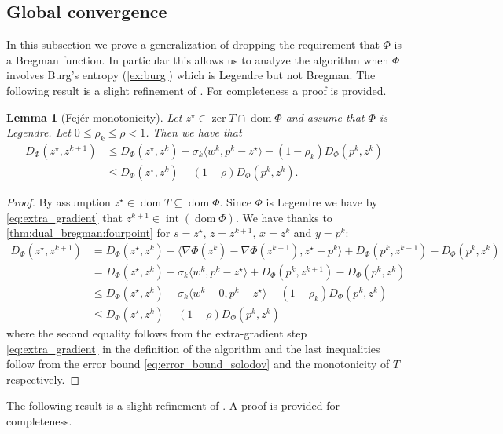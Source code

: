 \documentclass[11pt,onecolumn]{article}
\DeclareMathOperator{\dom}{dom}
\DeclareMathOperator{\intr}{int}
\DeclareMathOperator{\zer}{zer}
\newtheorem{lemma}[lemma]{Lemma}
\theoremstyle{remark}
\begin{document}
\subsection{Global convergence} \label{sec:global_ppa}
In this subsection we prove a generalization of \cite[Theorem 3.2(1)]{solodov2000inexact} dropping the requirement that $\Phi$ is a Bregman function.
In particular this allows us to analyze the algorithm when $\Phi$ involves Burg's entropy (\cref{ex:burg}) which is Legendre but not Bregman.
The following result is a slight refinement of \cite[Lemma 4.1]{solodov2000inexact}. For completeness a proof is provided.
\begin{lemma}[Fej\'er monotonicity] \label{thm:fejer_prox_solodov}
Let $z^\star \in \zer T \cap \dom \Phi$ and assume that $\Phi$ is Legendre. Let $0\leq \rho_k\leq \rho < 1$. Then we have that
\begin{align*}
D_\Phi(z^\star,z^{k+1}) &\leq D_\Phi(z^\star,z^k) - \sigma_k \langle w^{k}, p^{k}-z^\star \rangle -(1-\rho_k)D_\Phi(p^{k},z^k) \\
&\leq D_\Phi(z^\star,z^k) -(1-\rho)D_\Phi(p^{k},z^k).
\end{align*}
\end{lemma}
\begin{proof}
By assumption $z^\star \in \dom T \subseteq \dom \Phi$. Since $\Phi$ is Legendre we have by \eqref{eq:extra_gradient} that $z^{k+1} \in \intr(\dom \Phi)$.
We have thanks to \cref{thm:dual_bregman:fourpoint} for $s=z^\star$, $z=z^{k+1}$, $x = z^k$ and $y=p^{k}$:
\begin{align*}
D_\Phi(z^\star,z^{k+1}) &= D_\Phi(z^\star,z^k) + \langle \nabla \Phi(z^k) - \nabla \Phi(z^{k+1}), z^\star-p^{k} \rangle + D_\Phi(p^{k},z^{k+1}) - D_\Phi(p^{k},z^k) \\
&=D_\Phi(z^\star,z^k) -\sigma_k\langle w^{k}, p^{k}-z^\star \rangle + D_\Phi(p^{k},z^{k+1}) - D_\Phi(p^{k},z^k) \\ 
&\leq D_\Phi(z^\star,z^k)-\sigma_k \langle w^{k}-0, p^{k}-z^\star \rangle -(1-\rho_k)D_\Phi(p^{k},z^k) \\
&\leq D_\Phi(z^\star,z^k) -(1-\rho)D_\Phi(p^{k},z^k)
\end{align*}
where the second equality follows from the extra-gradient step \cref{eq:extra_gradient} in the definition of the algorithm and the last inequalities follow from the error bound \cref{eq:error_bound_solodov} and the monotonicity of $T$ respectively.
\end{proof}
The following result is a slight refinement of \cite[Corollary 4.3]{solodov2000inexact}. A proof is provided for completeness.
\end{document}
